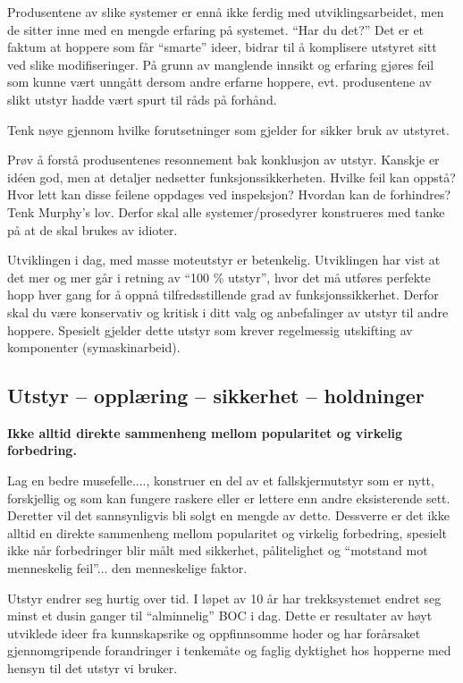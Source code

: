 Produsentene av slike systemer er ennå ikke ferdig med utviklingsarbeidet, men de sitter inne med en mengde erfaring på systemet. ``Har du det?'' Det er et faktum at hoppere som får ``smarte'' ideer, bidrar til å komplisere utstyret sitt ved slike modifiseringer. På grunn av manglende innsikt og erfaring gjøres feil som kunne vært unngått dersom andre erfarne hoppere, evt. produsentene av slikt utstyr hadde vært spurt til råds på forhånd.

Tenk nøye gjennom hvilke forutsetninger som gjelder for sikker bruk av utstyret.

Prøv å forstå produsentenes resonnement bak konklusjon av utstyr. Kanskje er idéen god, men at detaljer nedsetter funksjonssikkerheten. Hvilke feil kan oppstå? Hvor lett kan disse feilene oppdages ved inspeksjon? Hvordan kan de forhindres? Tenk Murphy's lov. Derfor skal alle systemer/prosedyrer konstrueres med tanke på at de skal brukes av idioter.

Utviklingen i dag, med masse moteutstyr er betenkelig. Utviklingen har vist at det mer og mer går i retning av ``100 \% utstyr'', hvor det må utføres perfekte hopp hver gang for å oppnå tilfredsstillende grad av funksjonssikkerhet. Derfor skal du være konservativ og kritisk i ditt valg og anbefalinger av utstyr til andre hoppere. Spesielt gjelder dette utstyr som krever regelmessig utskifting av komponenter (symaskinarbeid).

\subsection{Utstyr – opplæring – sikkerhet – holdninger}
\textbf{Ikke alltid direkte sammenheng mellom popularitet og virkelig forbedring.}

Lag en bedre musefelle...., konstruer en del av et fallskjermutstyr som er nytt, forskjellig og som kan fungere raskere eller er lettere enn andre eksisterende sett. Deretter vil det sannsynligvis bli solgt en mengde av dette. Dessverre er det ikke alltid en direkte sammenheng mellom popularitet og virkelig forbedring, spesielt ikke når forbedringer blir målt med sikkerhet, pålitelighet og ``motstand mot menneskelig feil''... den menneskelige faktor.

Utstyr endrer seg hurtig over tid. I løpet av 10 år har trekksystemet endret seg minst et dusin ganger til ``alminnelig'' BOC i dag. Dette er resultater av høyt utviklede ideer fra kunnskapsrike og oppfinnsomme hoder og har forårsaket gjennomgripende forandringer i tenkemåte og faglig dyktighet hos hopperne med hensyn til det utstyr vi bruker.

